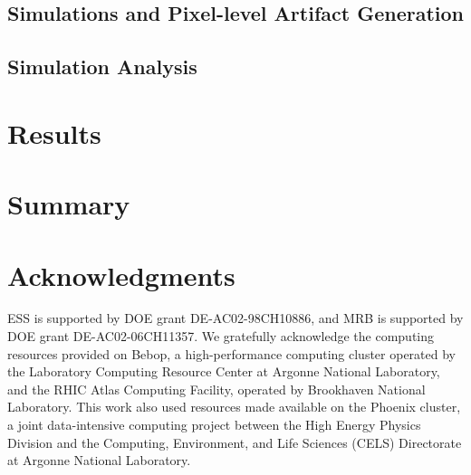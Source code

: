 \documentclass[twocolappendix, appendixfloats, numberedappendix, twocolumn, apj]{openjournal}
\begin{document}
\subsection{Simulations and Pixel-level Artifact Generation}

\subsection{Simulation Analysis}

\section{Results}\label{sec:results}

\section{Summary}\label{sec:conc}

\section*{Acknowledgments}

ESS is supported by DOE grant DE-AC02-98CH10886, and MRB is supported by DOE
grant DE-AC02-06CH11357.  We gratefully acknowledge the computing resources
provided on Bebop, a high-performance computing cluster operated by the
Laboratory Computing Resource Center at Argonne National Laboratory, and the
RHIC Atlas Computing Facility, operated by Brookhaven National Laboratory.
This work also used resources made available on the Phoenix cluster, a joint
data-intensive computing project between the High Energy Physics Division and
the Computing, Environment, and Life Sciences (CELS) Directorate at Argonne
National Laboratory.




\end{document}

